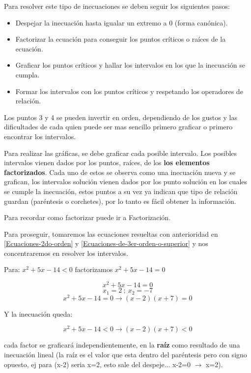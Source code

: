     Para resolver este tipo de inecuaciones se deben seguir los siguientes pasos:

    \begin{itemize}
        \item Despejar la inecuación hasta igualar un extremo a 0 (forma canónica).
        \item Factorizar la ecuación para conseguir los puntos críticos o raíces
            de la ecuación.
        \item Graficar los puntos críticos y hallar los intervalos en los que
            la inecuación se cumpla.
        \item Formar los intervalos con los puntos críticos y respetando los
            operadores de relación.
    \end{itemize}

    Los puntos 3 y 4 se pueden invertir en orden, dependiendo de los gustos y las
    dificultades de cada quien puede ser mas sencillo primero graficar o primero
    encontrar los intervalos.

    Para realizar las gráficas, se debe graficar cada
    posible intervalo. Los posibles intervalos vienen dados por los puntos, raíces,
    de los \textbf{los elementos factorizados}. Cada uno de estos se observa como
    una inecuación nueva y se grafican, los intervalos solución vienen dados por
    los punto solución en los cuales se cumple la inecuación, estos puntos
    a su vez ya indican que tipo de relación guardan (paréntesis o corchetes),
    por lo tanto es fácil obtener la información.

    Para recordar como factorizar puede ir a \refname{Factorización}.

    Para proseguir, tomaremos las ecuaciones resueltas con anterioridad en
    \ref{Ecuaciones-2do-orden} y \ref{Ecuaciones-de-3er-orden-o-superior}
    y nos concentraremos en resolver los intervalos.

    Para: $x^2+5x-14 < 0$ factorizamos $x^2+5x-14 = 0$


    $$ x^2 + 5x -14 = 0$$
    $$ x_1 = 2\ ;\    x_2 = -7$$
    $$ x^2 + 5x -14 = 0 \longrightarrow  (x-2)(x+7) =0 $$

    Y la inecuación queda:

    $$ x^2 + 5x -14 < 0 \longrightarrow  (x-2)(x+7) < 0 $$

    cada factor se graficará independientemente, en la \textbf{raíz} como resultado
    de una inecuación lineal (la raíz es el valor
    que esta dentro del paréntesis pero con signo opuesto, ej para (x-2) seria
    x=2, esto sale del despeje... x-2=0 $\rightarrow$ x=2).


